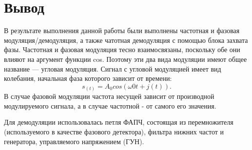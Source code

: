 \section{Вывод}

В результате выполнения данной работы были выполнены частотная и фазовая модуляция/демодуляция, а также чатотная демодуляция с  помощью блока захвата фазы. Частотная и фазовая модуляция тесно взаимосвязаны, поскольку обе они влияют на аргумент функции cos. Поэтому эти два вида модуляции имеют общее название — угловая модуляция. Сигнал с угловой модуляцией имеет вид колебания, начальная фаза которого зависит от времени:
	\begin{equation}
	s_(t) = A_0 cos(\omega0 t + j(t)).
	\end{equation}
В случае фазовой модуляции частота несущей зависит от производной модулируемого сигнала, а в случае частотной - от самого его значения.

Для демодуляции использовалась петля ФАПЧ, состоящая из перемножителя (используемого в качестве фазового детектора), фильтра нижних частот и генератора, управляемого напряжением (ГУН).
